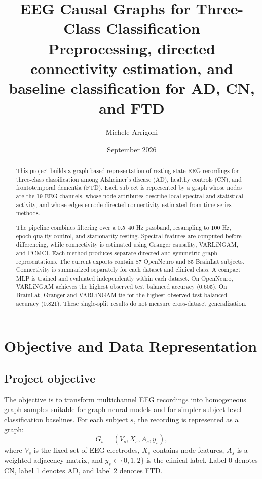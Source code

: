 \documentclass[11pt,a4paper]{article}
\title{
    \textbf{EEG Causal Graphs for Three-Class Classification}\\[0.35em]
    \large Preprocessing, directed connectivity estimation, and baseline
    classification for AD, CN, and FTD
}
\author{Michele Arrigoni}
\date{September 2026}
\begin{document}
\maketitle

\begin{abstract}
This project builds a graph-based representation of resting-state EEG
recordings for three-class classification among Alzheimer's disease (AD),
healthy controls (CN), and frontotemporal dementia (FTD). Each subject is
represented by a graph whose nodes are the 19 EEG channels, whose node
attributes describe local spectral and statistical activity, and whose edges
encode directed connectivity estimated from time-series methods.

The pipeline combines filtering over a 0.5--40 Hz passband, resampling to
100 Hz, epoch quality control, and stationarity testing. Spectral features
are computed before differencing, while connectivity is estimated using
Granger causality, VARLiNGAM, and PCMCI. Each method produces separate directed
and symmetric graph representations. The current exports contain 87 OpenNeuro
and 85 BrainLat subjects. Connectivity is summarized separately for each
dataset and clinical class. A compact MLP is trained and evaluated independently
within each dataset.
On OpenNeuro, VARLiNGAM achieves the highest observed test balanced accuracy (0.605).
On BrainLat, Granger and VARLiNGAM tie for the highest observed test balanced accuracy (0.821).
These single-split results do not measure cross-dataset generalization.
\end{abstract}

\tableofcontents
\newpage

\section{Objective and Data Representation}

\subsection{Project objective}

The objective is to transform multichannel EEG recordings into homogeneous
graph samples suitable for graph neural models and for simpler subject-level
classification baselines. For each subject $s$, the recording is represented
as a graph:
\[
    G_s=(V_s,X_s,A_s,y_s),
\]
where $V_s$ is the fixed set of EEG electrodes, $X_s$ contains node features,
$A_s$ is a weighted adjacency matrix, and $y_s\in\{0,1,2\}$ is the clinical
label. Label 0 denotes CN, label 1 denotes AD, and label 2 denotes FTD.
\end{document}
